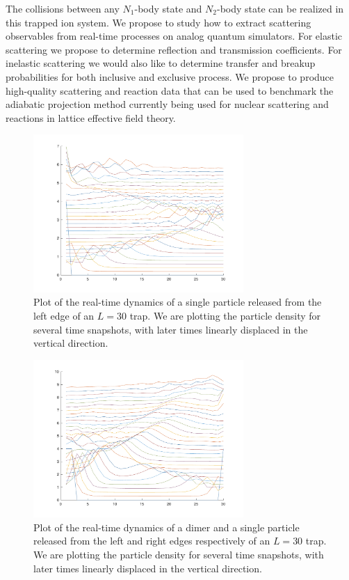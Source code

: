 \documentclass[10pt]{article}
\begin{document}
  The collisions between any $N_1$-body state and $N_2$-body state can
  be realized in this trapped ion system.  We propose to study how to
  extract scattering observables from real-time processes on analog
  quantum simulators.  For elastic scattering we propose to determine
  reflection and transmission coefficients.  For inelastic scattering
  we would also like to determine transfer and breakup probabilities
  for both inclusive and exclusive process. We propose to produce
  high-quality scattering and reaction data that can be used to
  benchmark the adiabatic projection method currently being used for
  nuclear scattering and reactions in lattice effective field theory.

\begin{figure}
\centering
\includegraphics[width=8cm]{particle_1}
\caption{Plot of the real-time dynamics of a single particle released from the left edge of an $L=30$ trap.  We are plotting the particle density for several time snapshots, with later times linearly displaced in the vertical direction.}
\label{particle}
\end{figure}
 
\begin{figure}
\centering
\includegraphics[width=8cm]{dimer_particle_1}
\caption{Plot of the real-time dynamics of a dimer and a single particle released from the left and right edges respectively of an $L=30$ trap.  We are plotting the particle density for
several time snapshots, with later times linearly displaced in the vertical
direction.}
\label{dimer_particle}
\end{figure}
\end{document}

